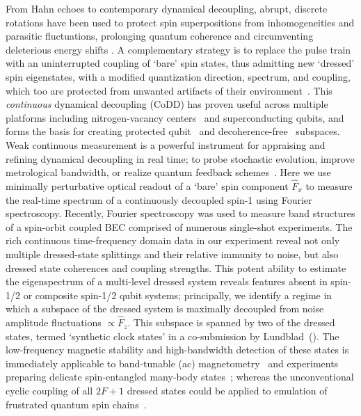 \documentclass[aps,prl,reprint,superscriptaddress,floatfix]{revtex4-1}
\begin{document}
From Hahn echoes to contemporary dynamical decoupling, abrupt, discrete rotations have been used to protect spin superpositions from inhomogeneities and parasitic fluctuations, prolonging quantum coherence and circumventing deleterious energy shifts \cite{biercuk_optimized_2009,lange_universal_2010,bluhm_dephasing_2011}.
A complementary strategy is to replace the pulse train with an uninterrupted coupling of `bare' spin states, thus admitting new `dressed' spin eigenstates, with a modified quantization direction, spectrum, and coupling, which too are protected from unwanted artifacts of their environment~\cite{fanchini_continuously_2007}.
This \textit{continuous} dynamical decoupling (CoDD) has proven useful across multiple platforms including nitrogen-vacancy centers~\cite{hirose_continuous_2012,loretz_radio-frequency_2013,cai_robust_2012,*cai_long-lived_2012,golter_protecting_2014} and superconducting qubits, and forms the basis for creating protected qubit~\cite{aharon_general_2013} and decoherence-free~\cite{facchi_quantum_2002,*facchi_unification_2004} subspaces.
Weak continuous measurement is a powerful instrument for appraising and refining dynamical decoupling in real time; to probe stochastic evolution, improve metrological bandwidth, or realize quantum feedback schemes~\cite{vijay_stabilizing_2012}.
Here we use minimally perturbative  optical readout of a `bare' spin component $\hat{F}_x$ to measure the real-time spectrum of a continuously decoupled spin-1 using Fourier spectroscopy. 
Recently, Fourier spectroscopy was used to measure band structures of a spin-orbit coupled BEC \cite{valdes-curiel_fourier_2017} comprised of numerous single-shot experiments.
The rich continuous time-frequency domain data in our experiment reveal not only multiple dressed-state splittings and their relative immunity to noise, but also dressed state coherences and coupling strengths.
This potent ability to estimate the eigenspectrum of a multi-level dressed system reveals features absent in spin-1/2 or composite spin-1/2 qubit systems; principally, we identify a regime in which a subspace of the dressed system is maximally decoupled from noise amplitude fluctuations $\propto \hat{F}_z$.
This subspace is spanned by two of the dressed states, termed `synthetic clock states' in a co-submission by Lundblad~\etal (\lundblad).
The low-frequency magnetic stability and high-bandwidth detection of these states is immediately applicable to band-tunable (ac) magnetometry~\cite{hirose_continuous_2012,loretz_radio-frequency_2013,ockeloen_quantum_2013,*horsley_frequency-tunable_2016} and experiments preparing delicate spin-entangled many-body states~\cite{stamper-kurn_spinor_2013}; whereas the unconventional cyclic coupling of all $2F+1$ dressed states could be applied to emulation of frustrated quantum spin chains~\cite{mikeska_one-dimensional_2004}.
\end{document}
